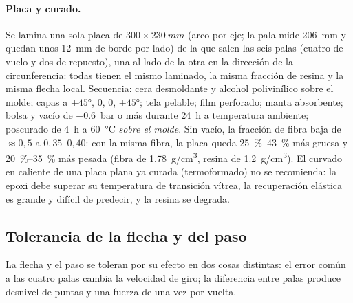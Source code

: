 \paragraph{Placa y curado.} Se lamina una sola placa de $300\times\SI{230}{mm}$ (arco por
eje; la pala mide \SI{206}{mm} y quedan unos \SI{12}{mm} de borde por lado) de la que salen las seis palas (cuatro de vuelo y dos de repuesto), una al lado de
la otra en la dirección de la circunferencia: todas tienen el mismo laminado, la misma
fracción de resina y la misma flecha local. Secuencia: cera desmoldante y alcohol
polivinílico sobre el molde; capas a $\pm\ang{45}$, $0$, $0$, $\pm\ang{45}$; tela
pelable; film perforado; manta absorbente; bolsa y vacío de \SI{-0.6}{bar} o más durante
24~h a temperatura ambiente; poscurado de 4~h a \SI{60}{\celsius} \emph{sobre el molde}.
Sin vacío, la fracción de fibra baja de $\approx0{,}5$ a $0{,}35$--$0{,}40$: con la misma
fibra, la placa queda \SIrange{25}{43}{\percent} más gruesa y \SIrange{20}{35}{\percent} más
pesada (fibra de \SI{1.78}{g/cm^3}, resina de \SI{1.2}{g/cm^3}). El curvado en caliente de una placa
plana ya curada (termoformado) no se recomienda: la epoxi debe superar su temperatura de
transición vítrea, la recuperación elástica es grande y difícil de predecir, y la resina
se degrada.

\subsection{Tolerancia de la flecha y del paso}\label{sec:fabricacion-flecha}

La flecha y el paso se toleran por su efecto en dos cosas distintas: el error común a las
cuatro palas cambia la velocidad de giro; la diferencia entre palas produce desnivel de
puntas y una fuerza de una vez por vuelta.

